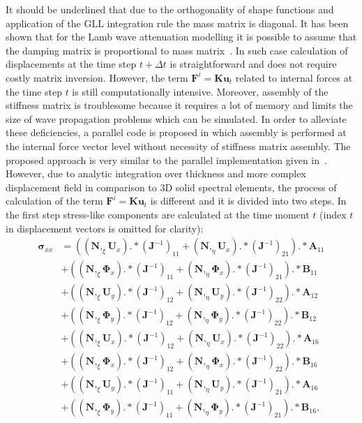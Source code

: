 \documentclass[preprint,12pt]{elsarticle}
\renewcommand{\vec}[1]{\mathbf{#1}}
\renewcommand{\bm}[1]{\mathbf{#1}}
\newcommand{\bs}[1]{\boldsymbol{#1}}
\begin{document}
	It should be underlined that due to the orthogonality of shape functions and application of the GLL integration rule the mass matrix is diagonal. It has been shown that for the Lamb wave attenuation modelling it is possible to assume that the damping matrix is proportional to mass matrix~\cite{Wandowski2017}. In such case calculation of displacements at the time step $t + \Delta t$ is straightforward and does not require costly matrix inversion. However, the term $\vec{F}^i=\bm{K}\vec{u}_t$ related to internal forces at the time step $t$ is still computationally intensive. Moreover, assembly of the stiffness matrix is troublesome because it requires a lot of memory and limits the size of wave propagation problems which can be simulated. In order to alleviate these deficiencies, a parallel code is proposed in which assembly is performed at the internal force vector level without necessity of stiffness matrix assembly. The proposed approach is very similar to the parallel implementation given in~\cite{Kudela2016}. However, due to analytic integration over thickness and more complex displacement field in comparison to 3D solid spectral elements, the process of calculation of the term $\vec{F}^i=\bm{K}\vec{u}_t$ is different and it is divided into two steps. In the first step stress-like components are calculated at the time moment $t$ (index $t$ in displacement vectors is omitted for clarity):
	\begin{equation}
	\begin{split}
	\bs{\sigma}_{xx}&=\left((\bm{N},_{\xi}\vec{U}_x).*(\vec{J}^{-1})_{11}+(\bm{N},_{\eta}\vec{U}_x).*(\vec{J}^{-1})_{21}\right).*\vec{A}_{11}\\
	&+\left((\bm{N},_{\xi}\bs{\Phi}_x).*(\vec{J}^{-1})_{11}+(\bm{N},_{\eta}\bs{\Phi}_x).*(\vec{J}^{-1})_{21}\right).*\vec{B}_{11}\\
	&+\left((\bm{N},_{\xi}\vec{U}_y).*(\vec{J}^{-1})_{12}+(\bm{N},_{\eta}\vec{U}_y).*(\vec{J}^{-1})_{22}\right).*\vec{A}_{12}\\
	&+\left((\bm{N},_{\xi}\bs{\Phi}_y).*(\vec{J}^{-1})_{12}+(\bm{N},_{\eta}\bs{\Phi}_y).*(\vec{J}^{-1})_{22}\right).*\vec{B}_{12}\\
	&+\left((\bm{N},_{\xi}\vec{U}_x).*(\vec{J}^{-1})_{12}+(\bm{N},_{\eta}\vec{U}_x).*(\vec{J}^{-1})_{22}\right).*\vec{A}_{16}\\
	&+\left((\bm{N},_{\xi}\bs{\Phi}_x).*(\vec{J}^{-1})_{12}+(\bm{N},_{\eta}\bs{\Phi}_x).*(\vec{J}^{-1})_{22}\right).*\vec{B}_{16}\\
	&+\left((\bm{N},_{\xi}\vec{U}_y).*(\vec{J}^{-1})_{11}+(\bm{N},_{\eta}\vec{U}_y).*(\vec{J}^{-1})_{21}\right).*\vec{A}_{16}\\
	&+\left((\bm{N},_{\xi}\bs{\Phi}_y).*(\vec{J}^{-1})_{11}+(\bm{N},_{\eta}\bs{\Phi}_y).*(\vec{J}^{-1})_{21}\right).*\vec{B}_{16},
	\end{split}
	\end{equation}
\end{document}
